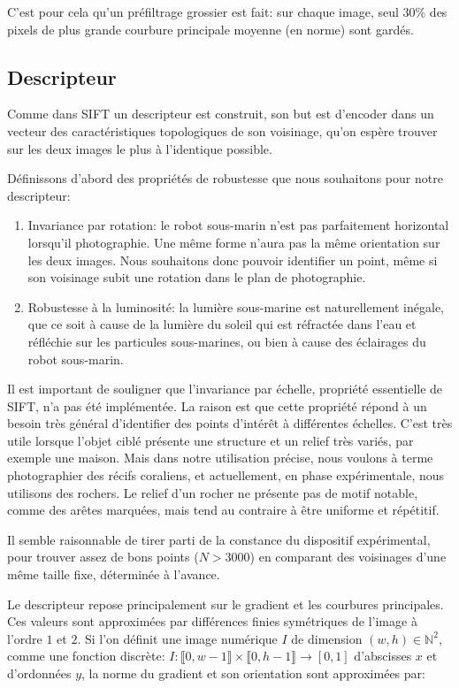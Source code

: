 \documentclass[
	a4paper, %
	10pt, %
	unnumberedsections, %
	twoside, %
]{LTJournalArticle}
\begin{document}
C'est pour cela qu'un préfiltrage grossier est fait: sur chaque image,
seul $30 \%$ des pixels de plus grande courbure principale moyenne (en norme)
sont gardés.

\subsection{Descripteur}
Comme dans SIFT un descripteur est construit,
son but est d'encoder dans un vecteur des caractéristiques topologiques de son voisinage, qu'on espère trouver
sur les deux images le plus à l'identique possible.

Définissons d'abord des propriétés de robustesse
que nous souhaitons pour notre descripteur:

\begin{enumerate}
	\item Invariance par rotation: le robot sous-marin n'est pas parfaitement
	      horizontal lorsqu'il photographie. Une même forme n'aura pas la même
	      orientation sur les deux images. Nous souhaitons donc pouvoir identifier un
	      point, même si son voisinage subit une rotation dans le plan de photographie.
	\item Robustesse à la luminosité: la lumière sous-marine est naturellement inégale,
	      que ce soit à cause de la lumière du soleil qui est réfractée dans l'eau
	      et réfléchie sur les particules sous-marines, ou bien à
	      cause des éclairages du robot sous-marin.
\end{enumerate}

Il est important de souligner que l'invariance par échelle, propriété essentielle de SIFT,
n'a pas été implémentée. La raison est que cette propriété
répond à un besoin très général d'identifier des points d'intérêt à différentes
échelles. C'est très utile lorsque l'objet ciblé présente une structure et
un relief très variés, par exemple une maison. Mais dans notre utilisation précise,
nous voulons à terme photographier des récifs coraliens, et actuellement, en
phase expérimentale, nous utilisons des rochers. Le relief d'un rocher ne présente
pas de motif notable, comme des arêtes marquées, mais tend au contraire à être
uniforme et répétitif.

Il semble raisonnable de tirer parti de la
constance du dispositif expérimental, pour trouver assez de bons points ($N > 3000$)
en comparant des voisinages d'une même taille fixe, déterminée à l'avance.



Le descripteur repose principalement sur le gradient et les courbures principales.
Ces valeurs sont approximées par différences finies symétriques de l'image à l'ordre $1$ et $2$.
Si l'on définit une image numérique $I$ de dimension $(w, h) \in \mathbb{N}^2$,
comme une fonction discrète:
$I: \llbracket 0, w-1 \rrbracket \times \llbracket 0, h-1 \rrbracket \rightarrow [0, 1]$
d'abscisses $x$ et d'ordonnées $y$, la norme du gradient
et son orientation sont approximées par:
\end{document}
